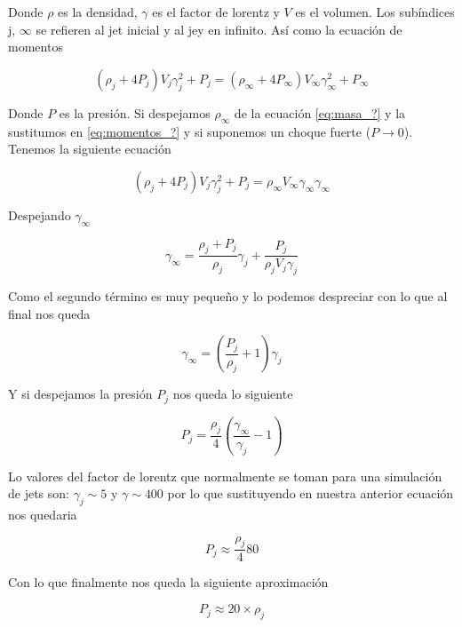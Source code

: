 \documentclass[12pt,a4paper]{book}
\begin{document}
Donde $\rho$ es la densidad, $\gamma$ es el factor de lorentz y $V$ es el volumen. Los subíndices j, $\infty$ se refieren al jet inicial y al jey en infinito. Así como la ecuación de momentos

\begin{equation}\label{eq:momentos_?}
\left( \rho_j + 4P_j \right) V_j \gamma_j^2 + P_j = 
\left( \rho_{\infty} + 4P_{\infty} \right) V_{\infty} \gamma_{\infty}^2 + P_{\infty}
\end{equation}

Donde $P$ es la presión. Si despejamos $\rho_{\infty}$ de la ecuación \ref{eq:masa_?} y la sustitumos en \ref{eq:momentos_?} y si suponemos un choque fuerte ($P \rightarrow 0$).
Tenemos la siguiente ecuación 

\begin{equation}
\left( \rho_j + 4P_j \right) V_j \gamma_j^2 + P_j =
\rho_{\infty} V_{\infty} \gamma_{\infty} \gamma_{\infty} 
\end{equation}

Despejando $\gamma_{\infty}$

\begin{equation}
\gamma_{\infty} = \frac{\rho_j + P_j}{\rho_j}\gamma_j + \frac{P_j}{\rho_j V_j \gamma_j}
\end{equation}

Como el segundo término es muy pequeño y lo podemos despreciar con lo que al final nos queda

\begin{equation}
\gamma_{\infty} =  \left( \frac{P_j}{\rho_j} + 1 \right) \gamma_j
\end{equation}

Y si despejamos la presión $P_j$ nos queda lo siguiente

\begin{equation}
P_j = \frac{\rho_j}{4} \left( \frac{\gamma_{\infty}}{\gamma_j} - 1 \right)
\end{equation}

Lo valores del factor de lorentz que normalmente se toman para una simulación de jets son: $ \gamma_j \sim 5$ y $\gamma \sim 400$ por lo que sustituyendo en nuestra anterior ecuación nos quedaria

\begin{equation}
P_j \approx \frac{\rho_j}{4}80
\end{equation}

Con lo que finalmente nos queda la siguiente aproximación

\begin{equation}
P_j \approx 20 \times \rho_j
\end{equation}
\end{document}
